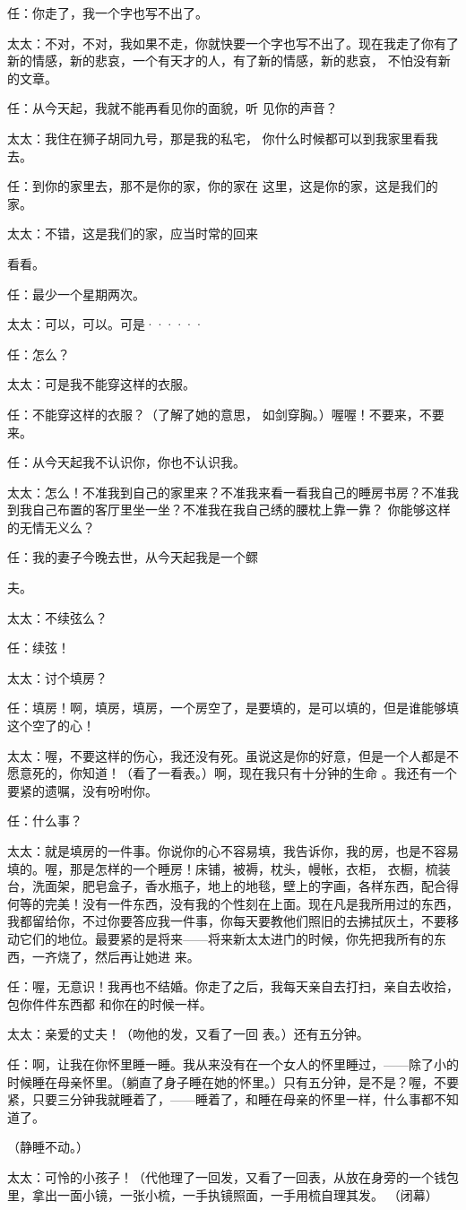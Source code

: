 \documentclass{article}
\begin{document}
任：你走了，我一个字也写不出了。 

太太：不对，不对，我如果不走，你就快要一个字也写不出了。现在我走了你有了新的情感，新的悲哀，一个有天才的人，有了新的情感，新的悲哀，
不怕没有新的文章。 

任：从今天起，我就不能再看见你的面貌，听
见你的声音？ 

太太：我住在狮子胡同九号，那是我的私宅，
你什么时候都可以到我家里看我去。 

任：到你的家里去，那不是你的家，你的家在
这里，这是你的家，这是我们的家。 

太太：不错，这是我们的家，应当时常的回来

\newpage
看看。 


任：最少一个星期两次。 


太太：可以，可以。可是······ 


任：怎么？ 


太太：可是我不能穿这样的衣服。 

任：不能穿这样的衣服？（了解了她的意思，
如剑穿胸。）喔喔！不要来，不要来。 



任：从今天起我不认识你，你也不认识我。 

太太：怎么！不准我到自己的家里来？不准我来看一看我自己的睡房书房？不准我到我自己布置的客厅里坐一坐？不准我在我自己绣的腰枕上靠一靠？
你能够这样的无情无义么？ 

任：我的妻子今晚去世，从今天起我是一个鳏
\newpage

夫。 


太太：不续弦么？ 


任：续弦！ 


太太：讨个填房？ 

任：填房！啊，填房，填房，一个房空了，是要填的，是可以填的，但是谁能够填这个空了的心！

太太：喔，不要这样的伤心，我还没有死。虽说这是你的好意，但是一个人都是不愿意死的，你知道！（看了一看表。）啊，现在我只有十分钟的生命
。我还有一个要紧的遗嘱，没有吩咐你。 


任：什么事？ 

太太：就是填房的一件事。你说你的心不容易填，我告诉你，我的房，也是不容易填的。喔，那是怎样的一个睡房！床铺，被褥，枕头，幔帐，衣柜，
\newpage
衣橱，梳装台，洗面架，肥皂盒子，香水瓶子，地上的地毯，壁上的字画，各样东西，配合得何等的完美！没有一件东西，没有我的个性刻在上面。现在凡是我所用过的东西，我都留给你，不过你要答应我一件事，你每天要教他们照旧的去拂拭灰土，不要移动它们的地位。最要紧的是将来——将来新太太进门的时候，你先把我所有的东西，一齐烧了，然后再让她进
来。 

任：喔，无意识！我再也不结婚。你走了之后，我每天亲自去打扫，亲自去收拾，包你件件东西都
和你在的时候一样。 

太太：亲爱的丈夫！（吻他的发，又看了一回
表。）还有五分钟。 

任：啊，让我在你怀里睡一睡。我从来没有在一个女人的怀里睡过，——除了小的时候睡在母亲怀里。（躺直了身子睡在她的怀里。）只有五分钟，是不是？喔，不要紧，只要三分钟我就睡着了，——睡着了，和睡在母亲的怀里一样，什么事都不知道了。
\newpage

（静睡不动。） 

太太：可怜的小孩子！（代他理了一回发，又看了一回表，从放在身旁的一个钱包里，拿出一面小镜，一张小梳，一手执镜照面，一手用梳自理其发。
（闭幕）
\end{document}
